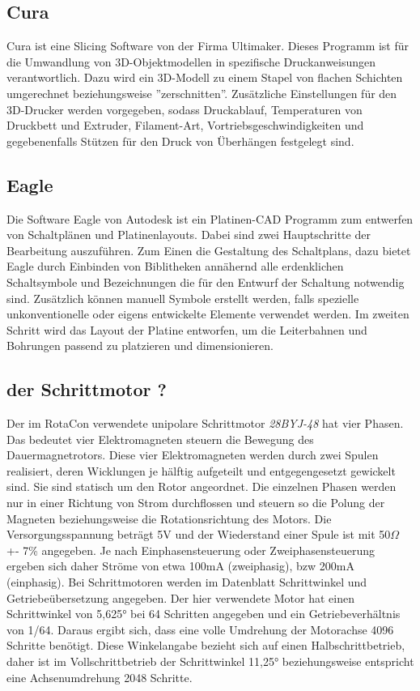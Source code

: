 \documentclass[11pt, titlepage, fleqn]{report}
\begin{document}
			\subsection{Cura}
			\label{sec:Cura}
				Cura ist eine Slicing Software von der Firma Ultimaker. Dieses Programm ist für die Umwandlung von 3D-Objektmodellen in spezifische 
				Druckanweisungen verantwortlich. Dazu wird ein 3D-Modell zu einem Stapel von flachen Schichten umgerechnet beziehungsweise ''zerschnitten''.
				Zusätzliche Einstellungen für den 3D-Drucker werden vorgegeben, sodass Druckablauf, Temperaturen von Druckbett und Extruder, Filament-Art, 
				Vortriebsgeschwindigkeiten und gegebenenfalls Stützen für den Druck von Überhängen festgelegt sind.
			\subsection{Eagle}
			\label{sec:Eagle}
				Die Software Eagle von Autodesk ist ein Platinen-CAD Programm zum entwerfen von Schaltplänen und Platinenlayouts. Dabei sind zwei Hauptschritte 
				der Bearbeitung auszuführen. Zum Einen die Gestaltung des Schaltplans, dazu bietet Eagle durch Einbinden von Biblitheken annähernd alle erdenklichen 
				Schaltsymbole und Bezeichnungen die für den Entwurf der Schaltung notwendig sind. Zusätzlich können manuell Symbole erstellt werden, falls spezielle 
				unkonventionelle oder eigens entwickelte Elemente verwendet werden.
				Im zweiten Schritt wird das Layout der Platine entworfen, um die Leiterbahnen und Bohrungen passend zu platzieren und dimensionieren.
			\subsection{der Schrittmotor ?}
			\label{sec:Motor}
				Der im RotaCon verwendete unipolare Schrittmotor \textit{28BYJ-48} hat vier Phasen. Das bedeutet vier Elektromagneten steuern die Bewegung 
				des Dauermagnetrotors. Diese vier Elektromagneten werden durch zwei Spulen realisiert, deren Wicklungen je hälftig aufgeteilt und entgegengesetzt gewickelt sind. Sie sind statisch 
				um den Rotor angeordnet. Die einzelnen Phasen werden nur in einer Richtung von Strom durchflossen und steuern so die Polung der Magneten beziehungsweise 
				die Rotationsrichtung des Motors. Die Versorgungsspannung beträgt 5V und der Wiederstand einer Spule ist mit 50$\Omega$ +- 7\% angegeben. Je nach Einphasensteuerung oder 
				Zweiphasensteuerung ergeben sich daher Ströme von etwa 100mA (zweiphasig), bzw 200mA (einphasig).
				Bei Schrittmotoren werden im Datenblatt Schrittwinkel und Getriebeübersetzung angegeben. Der hier verwendete Motor hat einen Schrittwinkel von 5,625° bei 64 Schritten 
				angegeben und ein Getriebeverhältnis von 1/64. Daraus ergibt sich, dass eine volle Umdrehung der Motorachse 4096 Schritte benötigt. Diese Winkelangabe bezieht sich auf 
				einen Halbschrittbetrieb, daher ist im Vollschrittbetrieb der Schrittwinkel 11,25° beziehungsweise entspricht eine Achsenumdrehung 2048 Schritte.
		\newpage
\end{document}
